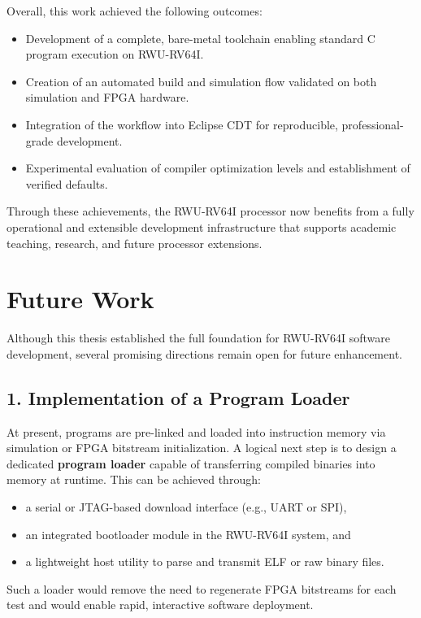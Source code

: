 Overall, this work achieved the following outcomes:
\begin{itemize}
    \item Development of a complete, bare-metal toolchain enabling standard C program execution on RWU-RV64I.
    \item Creation of an automated build and simulation flow validated on both simulation and FPGA hardware.
    \item Integration of the workflow into Eclipse CDT for reproducible, professional-grade development.
    \item Experimental evaluation of compiler optimization levels and establishment of verified defaults.
\end{itemize}

Through these achievements, the RWU-RV64I processor now benefits from a fully operational and extensible development infrastructure that supports academic teaching, research, and future processor extensions.

\section{Future Work}

Although this thesis established the full foundation for RWU-RV64I software development, several promising directions remain open for future enhancement.

\subsection*{1. Implementation of a Program Loader}
At present, programs are pre-linked and loaded into instruction memory via simulation or FPGA bitstream initialization.  
A logical next step is to design a dedicated \textbf{program loader} capable of transferring compiled binaries into memory at runtime.  
This can be achieved through:
\begin{itemize}
    \item a serial or JTAG-based download interface (e.g., UART or SPI),
    \item an integrated bootloader module in the RWU-RV64I system, and
    \item a lightweight host utility to parse and transmit ELF or raw binary files.
\end{itemize}
Such a loader would remove the need to regenerate FPGA bitstreams for each test and would enable rapid, interactive software deployment.

